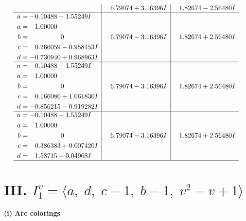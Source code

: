 \documentclass[1p]{elsarticle_modified}
\theoremstyle{definition}
\begin{document}
$$\begin{array}{c|c|c}
 & \phantom{-}6.79074 + 3.16396 I & \phantom{-}1.82674 - 2.56480 I \\ \hline\begin{aligned}
u &= -0.10488 - 1.55249 I \\
a &= \phantom{-}1.00000\phantom{ +0.000000I} \\
b &= \phantom{-0.000000 } 0 \\
c &= \phantom{-}0.266059 - 0.958153 I \\
d &= -0.730940 + 0.968963 I\end{aligned}
 & \phantom{-}6.79074 - 3.16396 I & \phantom{-}1.82674 + 2.56480 I \\ \hline\begin{aligned}
u &= -0.10488 - 1.55249 I \\
a &= \phantom{-}1.00000\phantom{ +0.000000I} \\
b &= \phantom{-0.000000 } 0 \\
c &= \phantom{-}0.166080 + 1.061830 I \\
d &= -0.856215 - 0.919282 I\end{aligned}
 & \phantom{-}6.79074 - 3.16396 I & \phantom{-}1.82674 + 2.56480 I \\ \hline\begin{aligned}
u &= -0.10488 - 1.55249 I \\
a &= \phantom{-}1.00000\phantom{ +0.000000I} \\
b &= \phantom{-0.000000 } 0 \\
c &= \phantom{-}0.386383 + 0.007420 I \\
d &= \phantom{-}1.58715 - 0.04968 I\end{aligned}
 & \phantom{-}6.79074 - 3.16396 I & \phantom{-}1.82674 + 2.56480 I\\
 \hline 
 \end{array}$$\newpage\newpage\renewcommand{\arraystretch}{1}
\centering \section*{III. $I^v_{1}= \langle a,\;d,\;c-1,\;b-1,\;v^2- v+1 \rangle$}
\flushleft \textbf{(i) Arc colorings}\\
\end{document}
